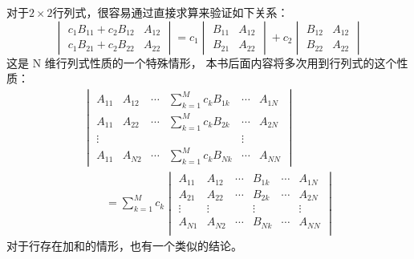 对于$2\times 2$行列式，很容易通过直接求算来验证如下关系：
\[
\begin{vmatrix}
 c_1B_{11} + c_2B_{12} & A_{12} \\ c_1B_{21} + c_2B_{22} & A_{22}
\end{vmatrix} = 
c_1 \begin{vmatrix}
 B_{11} & A_{12} \\ B_{21} & A_{22}
\end{vmatrix} + 
c_2 \begin{vmatrix}
 B_{12} & A_{12} \\ B_{22} & A_{22}
\end{vmatrix}
\]
这是 N 维行列式性质的一个特殊情形，
本书后面内容将多次用到行列式的这个性质：
\begin{equation}
 \begin{split}
 \begin{vmatrix}
     A_{11} & A_{12} &\cdots &\displaystyle\sum_{k=1}^M c_kB_{1k} &\cdots &A_{1N} \\ 
     A_{11} & A_{22} &\cdots &\displaystyle\sum_{k=1}^M c_kB_{2k} &\cdots &A_{2N} \\ 
     \vdots &\                &\           &\                                                       &\vdots \\
     A_{11} & A_{N2} &\cdots &\displaystyle\sum_{k=1}^M c_kB_{Nk} &\cdots &A_{NN}
 \end{vmatrix}\qquad \\
 \qquad = \sum_{k=1}^{M} c_k \begin{vmatrix}
     A_{11} & A_{12} &\cdots      &B_{1k}     & \cdots      & A_{1N} \\
     A_{21} & A_{22} &\cdots      &B_{2k}     & \cdots     & A_{2N} \\
     \vdots &\vdots     &\               &\vdots      &\          &\vdots \\
     A_{N1} & A_{N2} &\cdots      &B_{Nk}     & \cdots      & A_{NN} \\
 \end{vmatrix}
 \end{split}
 \label{eq:1.40}
\end{equation}
对于行存在加和的情形，也有一个类似的结论。

